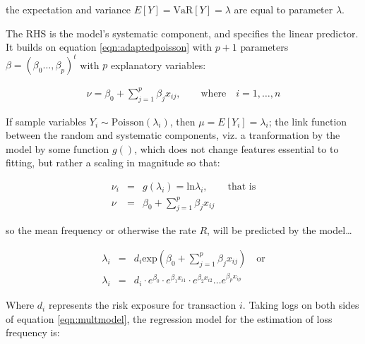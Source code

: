 \documentclass[]{DissertateUSU}
\begin{document}
\doublespacing
the expectation and variance
\(E[Y] = \mbox{VaR}[Y] = \lambda\)
are equal to parameter \(\lambda\).\medskip

The RHS is the model's systematic component, and specifies the linear
predictor. It builds on equation \ref{eqn:adaptedpoisson} with \(p+1\)
parameters \(\beta = (\beta_0\ldots,\beta_p)^t\) with \(p\) explanatory
variables: \singlespacing

\begin{eqnarray}
\nu = \beta_0 + \sum_{j=1}^{p}\beta_jx_{ij}, \qquad \mbox{where} \quad i = 1,\ldots,n
\end{eqnarray}

\doublespacing

If sample variables \(Y_i \sim \mbox{Poisson}(\lambda_i)\), then
\(\mu = E[Y_i] = \lambda_i\); the link function between the random and
systematic components, viz. a tranformation by the model by some
function \(g()\), which does not change features essential to to
fitting, but rather a scaling in magnitude so that:

\singlespacing

\begin{eqnarray}\label{eqn:linkfcn }
\nu_i &=& g(\lambda_i) = \mbox{ln}\lambda_i, \qquad \mbox{that is} \nonumber \\
\nu &=& \beta_0 + \sum_{j=1}^{p}\beta_jx_{ij}
\end{eqnarray}

\doublespacing

so the mean frequency or otherwise the rate \(R\), will be predicted by
the model\ldots

\singlespacing

\begin{eqnarray}\label{eqn:multmodel}
\lambda_i &=& d_i\mbox{exp}(\beta_0 + \sum_{j=1}^{p}\beta_jx_{ij}) \quad \mbox{or} \nonumber \\
\lambda_i &=& d_i\cdot e^{\beta_0}\cdot e^{\beta_1x_{i1}}\cdot e^{\beta_2x_{i2}} \ldots e^{\beta_px_{ip}}
\end{eqnarray}

\doublespacing

Where \(d_i\) represents the risk exposure for transaction \(i\). Taking
logs on both sides of equation \ref{eqn:multmodel}, the regression model
for the estimation of loss frequency is:

\singlespacing
\end{document}
